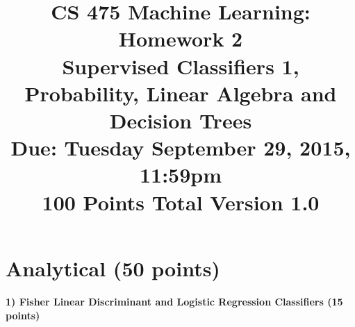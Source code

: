 \documentclass[11pt]{article}
\title{CS 475 Machine Learning: Homework 2\\Supervised Classifiers 1,\\
Probability, Linear Algebra and Decision Trees\\
\Large{Due: Tuesday September 29, 2015, 11:59pm}\\
100 Points Total \hspace{1cm} Version 1.0}
\author{}
\date{}
\begin{document}
\large
\maketitle
\thispagestyle{headings}

\vspace{-.5in}





\section{Analytical (50 points)}

\paragraph{1) Fisher Linear Discriminant and Logistic Regression Classifiers (15 points)}
\end{document}
